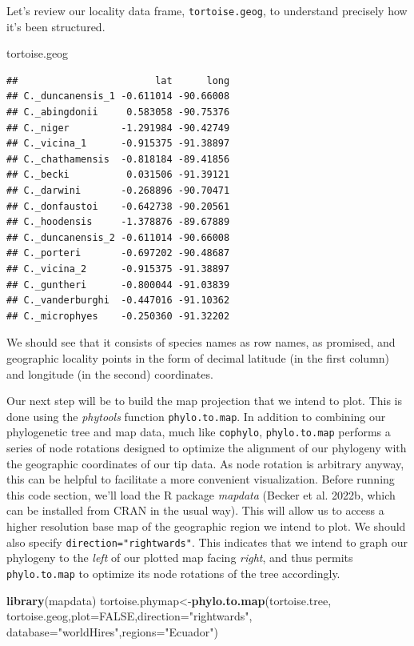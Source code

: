 \documentclass[fleqn,10pt,lineno]{wlpeerj} %
\newenvironment{Shaded}{\begin{snugshade}}{\end{snugshade}}
\newcommand{\AttributeTok}[1]{\textcolor[rgb]{0.13,0.29,0.53}{#1}}
\newcommand{\ConstantTok}[1]{\textcolor[rgb]{0.56,0.35,0.01}{#1}}
\newcommand{\FunctionTok}[1]{\textcolor[rgb]{0.13,0.29,0.53}{\textbf{#1}}}
\newcommand{\NormalTok}[1]{#1}
\newcommand{\OtherTok}[1]{\textcolor[rgb]{0.56,0.35,0.01}{#1}}
\newcommand{\StringTok}[1]{\textcolor[rgb]{0.31,0.60,0.02}{#1}}
\begin{document}
Let's review our locality data frame, \texttt{tortoise.geog}, to understand precisely how it's been structured.

\begin{Shaded}
\begin{Highlighting}[]
\NormalTok{tortoise.geog}
\end{Highlighting}
\end{Shaded}

\begin{verbatim}
##                        lat      long
## C._duncanensis_1 -0.611014 -90.66008
## C._abingdonii     0.583058 -90.75376
## C._niger         -1.291984 -90.42749
## C._vicina_1      -0.915375 -91.38897
## C._chathamensis  -0.818184 -89.41856
## C._becki          0.031506 -91.39121
## C._darwini       -0.268896 -90.70471
## C._donfaustoi    -0.642738 -90.20561
## C._hoodensis     -1.378876 -89.67889
## C._duncanensis_2 -0.611014 -90.66008
## C._porteri       -0.697202 -90.48687
## C._vicina_2      -0.915375 -91.38897
## C._guntheri      -0.800044 -91.03839
## C._vanderburghi  -0.447016 -91.10362
## C._microphyes    -0.250360 -91.32202
\end{verbatim}

We should see that it consists of species names as row names, as promised, and geographic locality points in the form of decimal latitude (in the first column) and longitude (in the second) coordinates.

Our next step will be to build the map projection that we intend to plot. This is done using the \emph{phytools} function \texttt{phylo.to.map}. In addition to combining our phylogenetic tree and map data, much like \texttt{cophylo}, \texttt{phylo.to.map} performs a series of node rotations designed to optimize the alignment of our phylogeny with the geographic coordinates of our tip data. As node rotation is arbitrary anyway, this can be helpful to facilitate a more convenient visualization. Before running this code section, we'll load the R package \emph{mapdata} (Becker et al. 2022b, which can be installed from CRAN in the usual way). This will allow us to access a higher resolution base map of the geographic region we intend to plot. We should also specify \texttt{direction="rightwards"}. This indicates that we intend to graph our phylogeny to the \emph{left} of our plotted map facing \emph{right}, and thus permits \texttt{phylo.to.map} to optimize its node rotations of the tree accordingly.

\begin{Shaded}
\begin{Highlighting}[]
\FunctionTok{library}\NormalTok{(mapdata)}
\NormalTok{tortoise.phymap}\OtherTok{\textless{}{-}}\FunctionTok{phylo.to.map}\NormalTok{(tortoise.tree,}
\NormalTok{  tortoise.geog,}\AttributeTok{plot=}\ConstantTok{FALSE}\NormalTok{,}\AttributeTok{direction=}\StringTok{"rightwards"}\NormalTok{,}
  \AttributeTok{database=}\StringTok{"worldHires"}\NormalTok{,}\AttributeTok{regions=}\StringTok{"Ecuador"}\NormalTok{)}
\end{Highlighting}
\end{Shaded}
\end{document}
